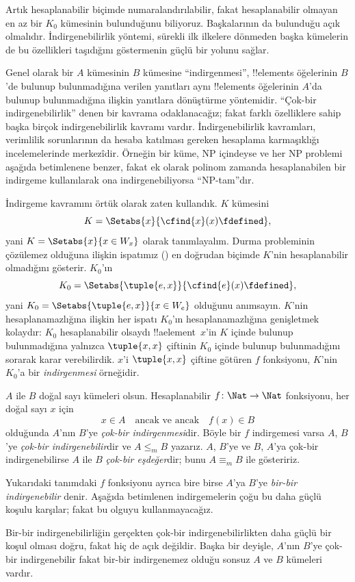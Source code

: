 \documentclass[../../../include/open-logic-section]{subfiles}
\begin{document}

\begin{explain}
Artık hesaplanabilir biçimde numaralandırılabilir, fakat hesaplanabilir
olmayan en az bir $K_0$ kümesinin bulunduğunu biliyoruz. Başkalarının da
bulunduğu açık olmalıdır. İndirgenebilirlik yöntemi, sürekli ilk ilkelere
dönmeden başka kümelerin de bu özellikleri taşıdığını göstermenin güçlü bir
yolunu sağlar.

Genel olarak bir $A$ kümesinin $B$ kümesine ``indirgenmesi'', !!{element}s
öğelerinin $B$'de bulunup bulunmadığına verilen yanıtları aynı !!{element}s
öğelerinin $A$'da bulunup bulunmadığına ilişkin yanıtlara dönüştürme
yöntemidir. ``Çok-bir indirgenebilirlik'' denen bir kavrama odaklanacağız;
fakat farklı özelliklere sahip başka birçok indirgenebilirlik kavramı vardır.
İndirgenebilirlik kavramları, verimlilik sorunlarının da hesaba katılması
gereken hesaplama karmaşıklığı incelemelerinde merkezîdir. Örneğin bir küme,
NP içindeyse ve her NP problemi aşağıda betimlenene benzer, fakat ek olarak
polinom zamanda hesaplanabilen bir indirgeme kullanılarak ona
indirgenebiliyorsa ``NP-tam''dır.

İndirgeme kavramını örtük olarak zaten kullandık. $K$ kümesini
\[
  K=\Setabs{x}{\cfind{x}(x)\fdefined},
\]
yani $K=\Setabs{x}{x\in W_x}$ olarak tanımlayalım. Durma probleminin
çözülemez olduğuna ilişkin ispatımız () en
doğrudan biçimde $K$'nin hesaplanabilir olmadığını gösterir. $K_0$'ın
\[
  K_0=\Setabs{\tuple{e,x}}{\cfind{e}(x)\fdefined},
\]
yani $K_0=\Setabs{\tuple{e,x}}{x\in W_e}$ olduğunu anımsayın. $K$'nin
hesaplanamazlığına ilişkin her ispatı $K_0$'ın hesaplanamazlığına genişletmek
kolaydır: $K_0$ hesaplanabilir olsaydı !!a{element}~$x$'in $K$ içinde bulunup
bulunmadığına yalnızca $\tuple{x,x}$ çiftinin $K_0$ içinde bulunup
bulunmadığını sorarak karar verebilirdik. $x$'i $\tuple{x,x}$ çiftine
götüren $f$ fonksiyonu, $K$'nin $K_0$'a bir \emph{indirgenmesi} örneğidir.
\end{explain}

\begin{defn}
$A$ ile $B$ doğal sayı kümeleri olsun. Hesaplanabilir
$f\colon\Nat\to\Nat$ fonksiyonu, her doğal sayı $x$ için
\[
  x\in A \quad\text{ancak ve ancak}\quad f(x)\in B
\]
olduğunda $A$'nın $B$'ye \emph{çok-bir indirgenmesi}dir. Böyle bir $f$
indirgemesi varsa $A$, $B$'ye \emph{çok-bir indirgenebilir}dir ve
$A\leq_m B$ yazarız. $A$, $B$'ye ve $B$, $A$'ya çok-bir indirgenebilirse
$A$ ile $B$ \emph{çok-bir eşdeğer}dir; bunu $A\equiv_m B$ ile gösteririz.
\end{defn}

Yukarıdaki tanımdaki $f$ fonksiyonu ayrıca bire birse $A$'ya $B$'ye
\emph{bir-bir indirgenebilir} denir. Aşağıda betimlenen indirgemelerin çoğu
bu daha güçlü koşulu karşılar; fakat bu olguyu kullanmayacağız.

\begin{digress}
Bir-bir indirgenebilirliğin gerçekten çok-bir indirgenebilirlikten daha güçlü
bir koşul olması doğru, fakat hiç de açık değildir. Başka bir deyişle,
$A$'nın $B$'ye çok-bir indirgenebilir fakat bir-bir indirgenemez olduğu sonsuz
$A$ ve $B$ kümeleri vardır.
\end{digress}
\end{document}
